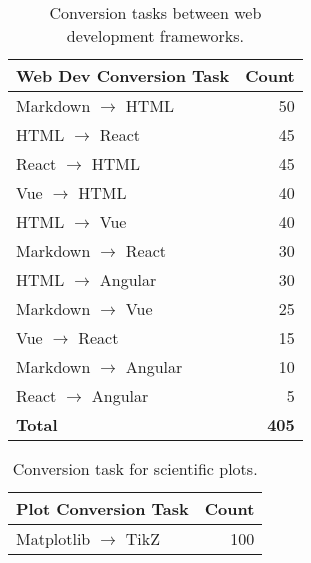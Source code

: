 
\begin{table}[h]
\centering
\small
\begin{tabular}{l r}
\toprule
\textbf{Web Dev Conversion Task} & \textbf{Count} \\
\midrule
Markdown $\rightarrow$ HTML      & 50 \\
HTML $\rightarrow$ React         & 45 \\
React $\rightarrow$ HTML         & 45 \\
Vue $\rightarrow$ HTML           & 40 \\
HTML $\rightarrow$ Vue           & 40 \\
Markdown $\rightarrow$ React     & 30 \\
HTML $\rightarrow$ Angular       & 30 \\
Markdown $\rightarrow$ Vue       & 25 \\
Vue $\rightarrow$ React          & 15 \\
Markdown $\rightarrow$ Angular   & 10 \\
React $\rightarrow$ Angular      & 5 \\
\midrule
\textbf{Total}                   & \textbf{405} \\
\bottomrule
\end{tabular}
\caption{Conversion tasks between web development frameworks.}
\label{tab:conversion_tasks}
\end{table}

\begin{table}[h]
\centering
\small
\begin{tabular}{l r}
\toprule
\textbf{Plot Conversion Task} & \textbf{Count} \\
\midrule
Matplotlib $\rightarrow$ TikZ & 100 \\
\bottomrule
\end{tabular}
\caption{Conversion task for scientific plots.}
\end{table}


